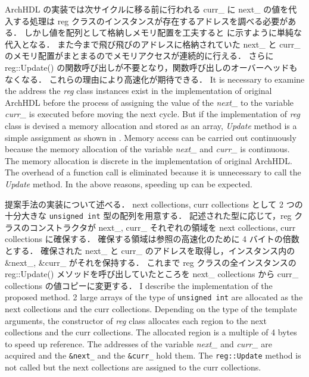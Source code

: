 ArchHDL の実装では次サイクルに移る前に行われる curr\_ に next\_ の値を代入する処理は
reg クラスのインスタンスが存在するアドレスを調べる必要がある．
しかし値を配列として格納しメモリ配置を工夫すると に示すように単純な代入となる．
また今まで飛び飛びのアドレスに格納されていた next\_ と curr\_ のメモリ配置がまとまるのでメモリアクセスが連続的に行える．
さらに reg::Update() の関数呼び出しが不要となり，関数呼び出しのオーバーヘッドもなくなる．
これらの理由により高速化が期待できる．
\fi
It is necessary to examine the address the \textit{reg} class instances exist in the implementation of original ArchHDL
before the process of assigning the value of the \textit{next\_} to the variable \textit{curr\_} is executed before moving the next cycle.
But if the implementation of \textit{reg} class is devised a memory allocation and stored as an array, \textit{Update} method is a simple assignment as shown in .
Memory access can be carried out continuously
because the memory allocation of the variable \textit{next\_} and \textit{curr\_} is continuous.
The memory allocation is discrete in the implementation of original ArchHDL.
The overhead of a function call is eliminated
because it is unnecessary to call the \textit{Update} method.
In the above reasons, speeding up can be expected.

提案手法の実装について述べる．
next collections, curr collections として 2 つの十分大きな \verb/unsigned int/ 型の配列を用意する．
記述された型に応じて，reg クラスのコンストラクタが next\_, curr\_ それぞれの領域を next collections, curr collections に確保する．
確保する領域は参照の高速化のために 4 バイトの倍数とする．
確保された next\_ と curr\_ のアドレスを取得し，インスタンス内の \&next\_, \&curr\_ がそれを保持する．
これまで reg クラスの全インスタンスの reg::Update() メソッドを呼び出していたところを next\_ collections から curr\_ collections の値コピーに変更する．
\fi
I describe the implementation of the proposed method.
2 large arrays of the type of \verb/unsigned int/ are allocated as the next collections and the curr collections.
Depending on the type of the template arguments, the constructor of \textit{reg} class allocates each region to the next collections and the curr collections.
The allocated region is a multiple of 4 bytes to speed up reference.
The addresses of the variable \textit{next\_} and \textit{curr\_} are acquired and
the \texttt{\&next\_} and the \texttt{\&curr\_} hold them.
The \texttt{reg::Update} method is not called
but the next collections are assigned to the curr collections.


